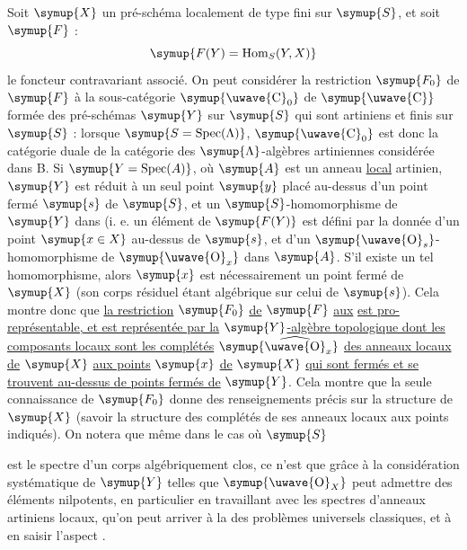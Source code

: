 Soit $\symup{X}$ un pré-schéma localement de type fini sur $\symup{S}$, et soit $\symup{F}$ :
\[
  \symup{F(Y)=\operatorname{Hom}_S(Y,X)}
\]
le foncteur contravariant associé. On peut considérer la restriction $\symup{F_0}$ de
$\symup{F}$ à la sous-catégorie $\symup{\text{\uwave{C}}_0}$ de $\symup{\text{\uwave{C}}}$ formée des
pré-schémas $\symup{Y}$ sur $\symup{S}$ qui sont artiniens et finis sur $\symup{S}$ : lorsque
$\symup{S=\operatorname{Spec}(\Lambda)}$, $\symup{\text{\uwave{C}}_0}$ est donc la catégorie duale
de la catégorie des $\symup{\Lambda}$-algèbres artiniennes considérée dans B. Si
$\symup{Y=\operatorname{Spec}(A)}$, où $\symup{A}$ est un anneau \uline{local} artinien, $\symup{Y}$ est
réduit à un seul point $\symup{y}$ placé au-dessus d'un point fermé $\symup{s}$ de $\symup{S}$, et un
$\symup{S}$-homomorphisme de $\symup{Y}$ dans (i. e. un élément de $\symup{F(Y)}$ est défini par
la donnée d'un point $\symup{x\in X}$ au-dessus de $\symup{s}$, et d'un
$\symup{\text{\uwave{O}}_s}$-homomorphisme de $\symup{\text{\uwave{O}}_x}$ dans $\symup{A}$. S'il existe
un tel homomorphisme, alors $\symup{x}$ est nécessairement un point fermé de $\symup{X}$ (son
corps résiduel étant algébrique sur celui de $\symup{s}$). Cela montre donc que \uline{la restriction} $\symup{F_0}$ \uline{de} $\symup{F}$ \uline{aux}  \uline{est
pro-représentable, et est représentée par la} $\symup{Y}$\uline{-algèbre topologique
dont les composants locaux sont les complétés}
$\symup{\widehat{\text{\uwave{O}}}_x}$ \uline{des anneaux locaux de} $\symup{X}$ \uline{aux points} $\symup{x}$ \uline{de} $\symup{X}$
\uline{qui sont fermés et se trouvent au-dessus de points fermés de} $\symup{Y}$. Cela montre
que la seule connaissance de $\symup{F_0}$ donne des renseignements précis sur la
structure de $\symup{X}$ (savoir la structure des complétés de ses anneaux locaux aux
points indiqués). On notera que même dans le cas où $\symup{S}$

est le spectre d'un corps algébriquement clos, ce n'est que grâce à la
considération systématique de  $\symup{Y}$ telles que
$\symup{\text{\uwave{O}}_X}$ peut admettre des éléments nilpotents, en particulier en
travaillant avec les spectres d'anneaux artiniens locaux, qu'on peut arriver à
la  des problèmes universels classiques, et à en saisir
l'aspect .

